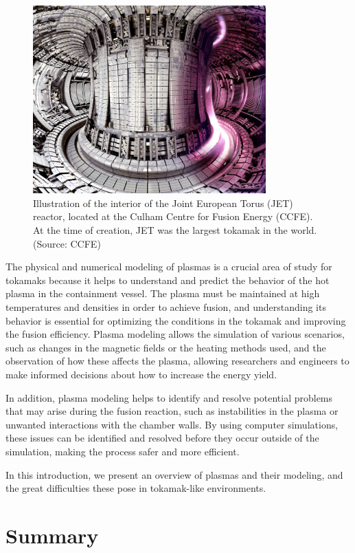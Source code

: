    \begin{figure}[!ht]
        \centering
        \includegraphics[width = 0.8\textwidth]{0 - introduction/images/JET.jpg}
        \caption{Illustration of the interior of the Joint European Torus (JET) reactor, located at the Culham Centre for Fusion Energy (CCFE). At the time of creation, JET was the largest tokamak in the world. (Source: CCFE)}
    \end{figure}

    The physical and numerical modeling of plasmas is a crucial area of study for tokamaks because it helps to understand and predict the behavior of the hot plasma in the containment vessel. The plasma must be maintained at high temperatures and densities in order to achieve fusion, and understanding its behavior is essential for optimizing the conditions in the tokamak and improving the fusion efficiency. Plasma modeling allows the simulation of various scenarios, such as changes in the magnetic fields or the heating methods used, and the observation of how these affects the plasma, allowing researchers and engineers to make informed decisions about how to increase the energy yield.
    
    In addition, plasma modeling helps to identify and resolve potential problems that may arise during the fusion reaction, such as instabilities in the plasma or unwanted interactions with the chamber walls. By using computer simulations, these issues can be identified and resolved before they occur outside of the simulation, making the process safer and more efficient.
    
    In this introduction, we present an overview of plasmas and their modeling, and the great difficulties these pose in tokamak-like environments.



    
    

    
    \section*{Summary}

